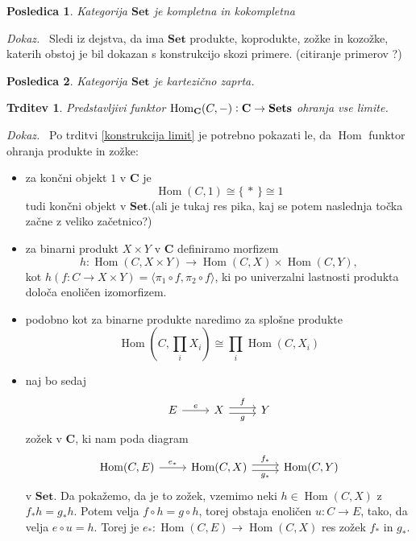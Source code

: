 \documentclass[12pt,a4paper]{book}
\theoremstyle{definition}
\theoremstyle{plain}
\newtheorem{trditev}[definicija]{Trditev}
\newtheorem{posledica}{Posledica}[definicija]
\newenvironment{dokaz}{\emph{Dokaz.}\ }{\hspace{\fill}{$\Box$}}
\theoremstyle{definition}
\theoremstyle{remark}
\newcommand{\cat}[1]{\textbf{#1}}
\DeclareMathOperator{\Hom}{Hom}
\renewcommand{\set}[1]{\{\,#1\,\}}
\begin{document}
\begin{posledica}
Kategorija $\cat{Set}$ je kompletna in kokompletna
\end{posledica}
\begin{dokaz}
Sledi iz dejstva, da ima $\cat{Set}$ produkte, koprodukte, zožke in kozožke, katerih obstoj je bil dokazan s konstrukcijo skozi primere. (citiranje primerov ?)
\end{dokaz}

\begin{posledica}
Kategorija $\cat{Set}$ je kartezično zaprta.
\end{posledica}

 
\begin{trditev} Predstavljivi funktor $\Hom_{\bf{C}}(C,-): \bf{C} \to \bf{Sets}$ ohranja vse limite.
\end{trditev}
\begin{dokaz}
Po trditvi \ref{konstrukcija limit} je potrebno pokazati le, da $\Hom$ funktor ohranja produkte in zožke:

\begin{itemize}
\item za končni objekt $1$ v $\cat{C}$ je 
$$\Hom(C,1) \cong \set{*} \cong 1$$
tudi končni objekt v $\cat{Set}.$(ali je tukaj res pika, kaj se potem naslednja točka začne z veliko začetnico?)
\item za binarni produkt $X \times Y$ v $\cat{C}$ definiramo morfizem 
$$h : \Hom(C, X \times Y) \to \Hom(C,X) \times \Hom(C,Y),$$
kot $h(f : C \to X \times Y) = \langle \pi_1 \circ f, \pi_2 \circ f \rangle$, ki po univerzalni lastnosti produkta določa enoličen izomorfizem.
\item podobno kot za binarne produkte naredimo za splošne produkte
$$\Hom(C, \prod_i X_i) \cong \prod_i \Hom(C, X_i)$$
\item naj bo sedaj
$$ \begin{tikzcd}[sep=normal]
E \ar[r, "e"] & X \ar[r, shift left, "f"] \ar[r, shift right, "g"'] & Y
\end{tikzcd} $$
zožek v $\cat{C}$, ki nam poda diagram
$$ \begin{tikzcd}[sep=normal]
\Hom(C,E) \ar[r, "e_*"] & \Hom(C,X) \ar[r, shift left, "f_*"] \ar[r, shift right, "g_*"'] & \Hom(C,Y)
\end{tikzcd} $$
v $\cat{Set}$. Da pokažemo, da je to zožek, vzemimo neki $h \in \Hom(C,X)$ z $f_* h = g_* h$. Potem velja $f \circ h = g \circ h$, torej obstaja enoličen $u : C \to E$, tako, da velja $e \circ u = h$. Torej je $e_* : \Hom(C,E) \to \Hom(C,X)$ res zožek $f_*$ in $g_*$.
\end{itemize}

\end{dokaz}
\end{document}
